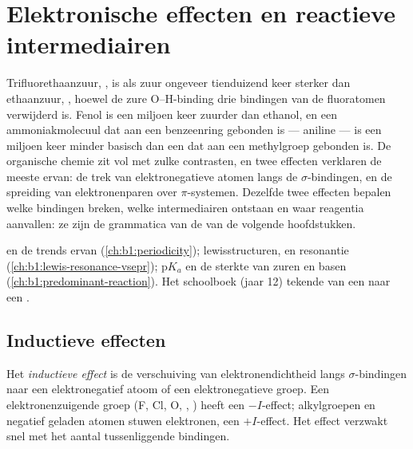 \chapter{Elektronische effecten en reactieve intermediairen}\label{ch:b1:electronic-effects}

Trifluorethaanzuur, , is als zuur ongeveer tienduizend keer
sterker dan ethaanzuur, , hoewel de zure O--H-binding drie
bindingen van de fluoratomen verwijderd is. Fenol is een miljoen keer
zuurder dan ethanol, en een ammoniakmolecuul dat aan een benzeenring
gebonden is --- aniline --- is een miljoen keer minder basisch dan een
dat aan een methylgroep gebonden is. De organische chemie zit vol met
zulke contrasten, en twee effecten verklaren de meeste ervan: de trek van
elektronegatieve atomen langs de $\sigma$-bindingen, en de spreiding van
elektronenparen over $\pi$-systemen. Dezelfde twee effecten bepalen welke
bindingen breken, welke intermediairen ontstaan en waar reagentia
aanvallen: ze zijn de grammatica van de  van de
volgende hoofdstukken.

\begin{recall}
 en de trends ervan (\cref{ch:b1:periodicity});
lewisstructuren,  en resonantie
(\cref{ch:b1:lewis-resonance-vsepr}); $\mathrm{p}K_a$ en de sterkte van
zuren en basen (\cref{ch:b1:predominant-reaction}). Het schoolboek (jaar
12) tekende  van een  naar een .
\end{recall}

\section{Inductieve effecten}

\begin{definition}\label{def:b1:electronic-effects:inductive}
Het \emph{inductieve effect} is de verschuiving
van elektronendichtheid langs $\sigma$-bindingen naar een elektronegatief
atoom of een elektronegatieve groep. Een elektronenzuigende groep (F, Cl,
O, , ) heeft een $-I$-effect; alkylgroepen en negatief
geladen atomen stuwen elektronen, een $+I$-effect. Het effect verzwakt
snel met het aantal tussenliggende bindingen.
\end{definition}

